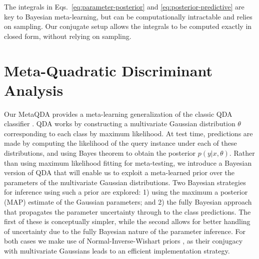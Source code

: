 \documentclass[10pt,twocolumn,letterpaper]{article}
\begin{document}
The integrals in Eqs.~\ref{eq:parameter-posterior} and \ref{eq:posterior-predictive} are key to Bayesian meta-learning, but can be computationally intractable and \cite{gordon2019metaPred} relies on sampling. Our conjugate setup allows the integrals to be computed exactly in closed form, without relying on sampling. 

\section{Meta-Quadratic Discriminant Analysis}
Our MetaQDA provides a meta-learning generalization of the classic QDA classifier \cite{hastie2009elements}. QDA works by constructing a multivariate Gaussian distribution $\theta$ corresponding to each class by maximum likelihood. At test time, predictions are made by computing the likelihood of the query instance under each of these distributions, and using Bayes theorem to obtain the posterior $p(y|x,\theta)$. 
Rather than using maximum likelihood fitting for meta-testing, we introduce a Bayesian version of QDA that will enable us to exploit a meta-learned prior over the parameters of the multivariate Gaussian distributions.
Two Bayesian strategies for inference using such a prior are explored: 1) using the maximum a posterior (MAP) estimate of the Gaussian parameters; and 2) the fully Bayesian approach that propagates the parameter uncertainty through to the class predictions. The first of these is conceptually simpler, while the second allows for better handling of uncertainty due to the fully Bayesian nature of the parameter inference. For both cases we make use of Normal-Inverse-Wishart priors \cite{gelman2003bda}, as their conjugacy with multivariate Gaussians leads to an efficient implementation strategy. 
\end{document}
